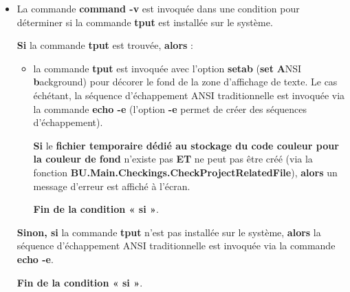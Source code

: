 \documentclass[a4paper,10pt]{article}
\begin{document}
\begin{itemize}
    \item
    {
        \begin{justify}
            La commande \textbf{\color{cmds}command -v} est invoquée dans une condition pour déterminer si la commande \textbf{\color{cmds}tput} est installée sur le système.
        \end{justify}

        \setlength{\parskip}{1em}

        \begin{justify}
            \textbf{\color{cond}Si} la commande \textbf{\color{cmds}tput} est trouvée, \textbf{\color{cond}alors} :

            \begin{itemize}
                \item
                {
                    \begin{justify}
                        la commande \textbf{\color{cmds}tput} est invoquée avec l'option \textbf{\color{cmds}setab} (\textbf{set} \textbf{A}NSI \textbf{b}ackground) pour décorer le fond de la zone d'affichage de texte. Le cas échétant, la séquence d'échappement ANSI traditionnelle est invoquée via la commande \textbf{\color{cmds}echo -e} (l'option \textbf{\color{cmds}-e} permet de créer des séquences d'échappement).
                    \end{justify}

                    \setlength{\parskip}{2em}

                    \begin{justify}
                        \textbf{\color{cond}Si} le \textbf{\color{path}fichier temporaire dédié au stockage du code couleur pour la couleur de fond} n'existe pas \textbf{ET} ne peut pas être créé (via la fonction \textbf{\color{func}BU.Main.Checkings.CheckProjectRelatedFile}), \textbf{\color{cond}alors} un message d'erreur est affiché à l'écran.
                    \end{justify}

                    \setlength{\parskip}{1em}

                    \begin{justify}
                        \textbf{\color{cond}Fin de la condition « si »}.
                    \end{justify}
                }
            \end{itemize}
        \end{justify}

        \begin{justify}
            \textbf{\color{cond}Sinon, si} la commande \textbf{\color{cmds}tput} n'est pas installée sur le système, \textbf{\color{cond}alors} la séquence d'échappement ANSI traditionnelle est invoquée via la commande \textbf{\color{cmds}echo -e}.
        \end{justify}

        \begin{justify}
            \textbf{\color{cond}Fin de la condition « si »}.
        \end{justify}
    }
\end{itemize}
\end{document}

